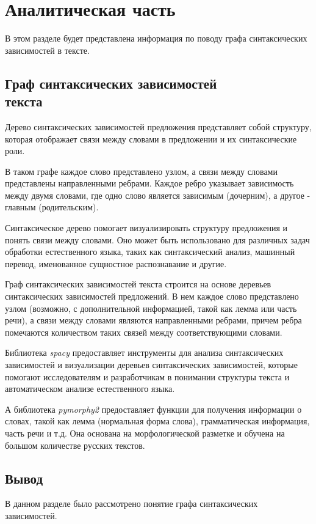 \chapter{Аналитическая часть}

В этом разделе будет представлена информация по поводу графа синтаксических зависимостей в тексте.

\section[Граф синтаксических зависимостей текста]{Граф синтаксических зависимостей\\текста}

Дерево синтаксических зависимостей предложения представляет собой структуру, которая отображает связи между словами в предложении и их синтаксические роли.

В таком графе каждое слово представлено узлом, а связи между словами представлены направленными ребрами. 
Каждое ребро указывает зависимость между двумя словами, где одно слово является зависимым (дочерним), а другое - главным (родительским).

Синтаксическое дерево помогает визуализировать структуру предложения и понять связи между словами. 
Оно может быть использовано для различных задач обработки естественного языка, таких как синтаксический анализ, машинный перевод, именованное сущностное распознавание и другие.

Граф синтаксических зависимостей текста строится на основе деревьев синтаксических зависимостей предложений. 
В нем каждое слово представлено узлом (возможно, с дополнительной информацией, такой как лемма или часть речи), а связи между словами являются направленными ребрами, причем ребра помечаются количеством таких связей между соответствующими словами.

Библиотека \textit{spacy} предоставляет инструменты для анализа синтаксических зависимостей и визуализации деревьев синтаксических зависимостей, которые помогают исследователям и разработчикам в понимании структуры текста и автоматическом анализе естественного языка.

А библиотека \textit{pymorphy2} предоставляет функции для получения информации о словах, такой как лемма (нормальная форма слова), грамматическая информация, часть речи и т.д. 
Она основана на морфологической разметке и обучена на большом количестве русских текстов.

\section*{Вывод}

В данном разделе было рассмотрено понятие графа синтаксических зависимостей.